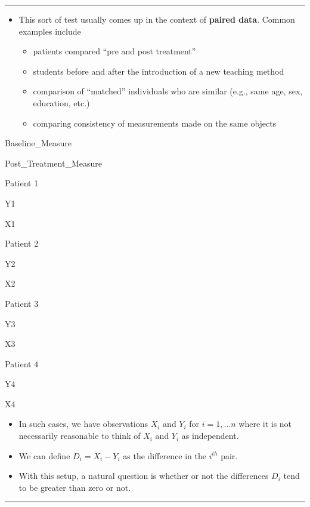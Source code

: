 \documentclass[]{book}
\providecommand{\tightlist}{%
  \setlength{\itemsep}{0pt}\setlength{\parskip}{0pt}}
\begin{document}
\begin{center}\rule{0.5\linewidth}{\linethickness}\end{center}

\begin{itemize}
\tightlist
\item
  This sort of test usually comes up in the context of \textbf{paired data}.
  Common examples include

  \begin{itemize}
  \tightlist
  \item
    patients compared ``pre and post treatment''
  \item
    students before and after the introduction of a new teaching method
  \item
    comparison of ``matched'' individuals who are similar (e.g., same age, sex, education, etc.)
  \item
    comparing consistency of measurements made on the same objects
  \end{itemize}
\end{itemize}

Baseline\_Measure

Post\_Treatment\_Measure

Patient 1

Y1

X1

Patient 2

Y2

X2

Patient 3

Y3

X3

Patient 4

Y4

X4

\begin{itemize}
\item
  In such cases, we have observations \(X_{i}\) and \(Y_{i}\) for \(i = 1,\ldots n\) where
  it is not necessarily reasonable to think of \(X_{i}\) and \(Y_{i}\) as independent.
\item
  We can define \(D_{i} = X_{i} - Y_{i}\) as the difference in the \(i^{th}\) pair.
\item
  With this setup, a natural question is whether or not the differences \(D_{i}\) tend to be
  greater than zero or not.
\end{itemize}

\begin{center}\rule{0.5\linewidth}{\linethickness}\end{center}
\end{document}

